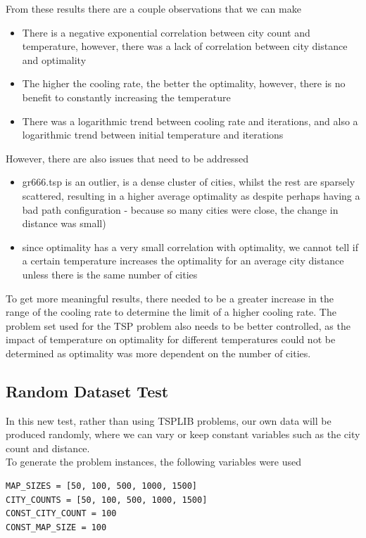 \documentclass{article}
\begin{document}
From these results there are a couple observations that we can make
\begin{itemize}
    \item There is a negative exponential correlation between city count and temperature, however, there was a lack of correlation between city distance and optimality
    \item The higher the cooling rate, the better the optimality, however, there is no benefit to constantly increasing the temperature
    \item There was a logarithmic trend between cooling rate and iterations, and also a logarithmic trend between initial temperature and iterations
\end{itemize}

However, there are also issues that need to be addressed
\begin{itemize}
    \item gr666.tsp is an outlier, is a dense cluster of cities, whilst the rest are sparsely scattered, resulting in a higher average optimality as despite perhaps having a bad path configuration - because so many cities were close, the change in distance was small)
    \item since optimality has a very small correlation with optimality, we cannot tell if a certain temperature increases the optimality for an average city distance unless there is the same number of cities
\end{itemize}

To get more meaningful results, there needed to be a greater increase in the range of the cooling rate to determine the limit of a higher cooling rate.
The problem set used for the TSP problem also needs to be better controlled, as the impact of temperature on optimality for different temperatures could not be determined as optimality was more dependent on the number of cities.

\subsection{Random Dataset Test}
In this new test, rather than using TSPLIB problems, our own data will be produced randomly, where we can vary or keep constant variables such as the city count and distance.
\\

To generate the problem instances, the following variables were used

\begin{verbatim}
MAP_SIZES = [50, 100, 500, 1000, 1500]
CITY_COUNTS = [50, 100, 500, 1000, 1500]
CONST_CITY_COUNT = 100
CONST_MAP_SIZE = 100
\end{verbatim}
\end{document}
